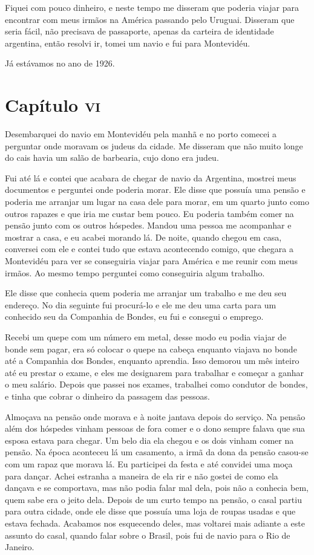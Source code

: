 Fiquei com pouco dinheiro, e neste tempo me disseram que poderia viajar
para encontrar com meus irmãos na América passando pelo Uruguai.
Disseram que seria fácil, não precisava de passaporte, apenas da
carteira de identidade argentina, então resolvi ir, tomei um navio e fui
para Montevidéu.

Já estávamos no ano de 1926.


\chapter{Capítulo \textsc{vi}}

Desembarquei do navio em Montevidéu pela manhã e no porto comecei a
perguntar onde moravam os judeus da cidade. Me disseram que não muito
longe do cais havia um salão de barbearia, cujo dono era judeu.

Fui até lá e contei que acabara de chegar de navio da Argentina, mostrei
meus documentos e perguntei onde poderia morar. Ele disse que possuía
uma pensão e poderia me arranjar um lugar na casa dele para morar, em um
quarto junto como outros rapazes e que iria me custar bem pouco. Eu
poderia também comer na pensão junto com os outros hóspedes. Mandou uma
pessoa me acompanhar e mostrar a casa, e eu acabei morando lá. De noite,
quando chegou em casa, conversei com ele e contei tudo que estava
acontecendo comigo, que chegara a Montevidéu para ver se conseguiria
viajar para América e me reunir com meus irmãos. Ao mesmo tempo
perguntei como conseguiria algum trabalho.

Ele disse que conhecia quem poderia me arranjar um trabalho e me deu seu
endereço. No dia seguinte fui procurá-lo e ele me deu uma carta para um
conhecido seu da Companhia de Bondes, eu fui e consegui o emprego.

Recebi um quepe com um número em metal, desse modo eu podia viajar de
bonde sem pagar, era só colocar o quepe na cabeça enquanto viajava no
bonde até a Companhia dos Bondes, enquanto aprendia. Isso demorou um mês
inteiro até eu prestar o exame, e eles me designarem para trabalhar e
começar a ganhar o meu salário. Depois que passei nos exames, trabalhei
como condutor de bondes, e tinha que cobrar o dinheiro da passagem das
pessoas.

Almoçava na pensão onde morava e à noite jantava depois do serviço. Na
pensão além dos hóspedes vinham pessoas de fora comer e o dono sempre
falava que sua esposa estava para chegar. Um belo dia ela chegou e os
dois vinham comer na pensão. Na época aconteceu lá um casamento, a irmã
da dona da pensão casou-se com um rapaz que morava lá. Eu participei da
festa e até convidei uma moça para dançar. Achei estranha a maneira de
ela rir e não gostei de como ela dançava e se comportava, mas não podia
falar mal dela, pois não a conhecia bem, quem sabe era o jeito dela.
Depois de um curto tempo na pensão, o casal partiu para outra cidade,
onde ele disse que possuía uma loja de roupas usadas e que estava
fechada. Acabamos nos esquecendo deles, mas voltarei mais adiante a este
assunto do casal, quando falar sobre o Brasil, pois fui de navio para o
Rio de Janeiro.

